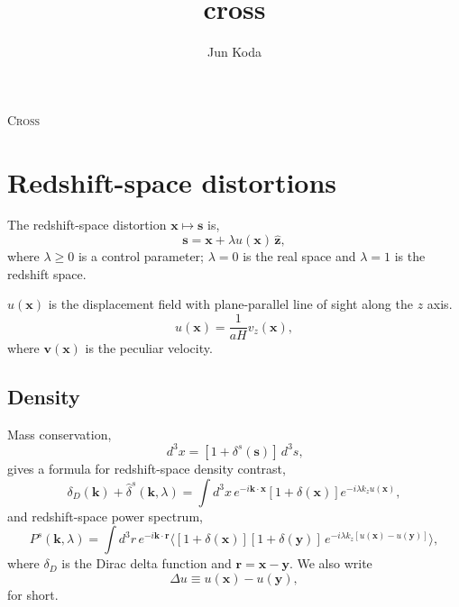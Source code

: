 \documentclass[a4paper,11pt, fleqn]{article}
\title{cross}
\author{Jun Koda}
\date{}
\begin{document}
%
%
\vspace{0.3 \paperheight}

\begin{center}
  {\Huge \textsc{Cross}}
\end{center}

\tableofcontents

\sectionfont{\sffamily\Huge\color{Green}\selectfont}
\subsectionfont{\sffamily\color{Green}\selectfont}
\subsubsectionfont{\sffamily\color{Green}\selectfont}
\paragraphfont{\sffamily\color{Green}\selectfont}

%
%
\newpage

\section{Redshift-space distortions}

The redshift-space distortion $\bm{x} \mapsto \bm{s}$ is,
%
\begin{equation}
  \bm{s} = \bm{x} + \lambda u(\bm{x}) \, \hat{\bm{z}},
\end{equation}
where $\lambda \ge 0$ is a control parameter; $\lambda = 0$ is the real space and $\lambda = 1$ is the redshift space.

$u(\bm{x})$ is the displacement field with plane-parallel line of
sight along the $z$ axis.
\begin{equation}
  u(\bm{x}) = \frac{1}{aH} v_z(\bm{x}),
\end{equation}
where $\bm{v}(\bm{x})$ is the peculiar velocity.

\subsection{Density}

Mass conservation,
%
\begin{equation}
  [1 + \delta(\bm{x})] \,d^3 x = [1 + \delta^s(\bm{s})] \,d^3 s,
\end{equation}
%
gives a formula for redshift-space density contrast,
%
\begin{equation}
  \label{eq:delta-s}
  \delta_D(\bm{k}) + \hat{\delta}^s(\bm{k}, \lambda)
  = \int \! d^3 x \, e^{-i\bm{k}\cdot\bm{x}} [1 + \delta(\bm{x})]
    e^{-i \lambda k_z u(\bm{x})},
\end{equation}
%
and redshift-space power spectrum,
%
\begin{equation}
  P^s(\bm{k}, \lambda) = \int \! d^3 r \, e^{-i\bm{k}\cdot\bm{r}}
  \Big\langle
      [1 + \delta(\bm{x})][1 + \delta(\bm{y})] \,
      e^{-i \lambda k_z [u(\bm{x}) - u(\bm{y})]}\Big\rangle,
\end{equation}
where $\delta_D$ is the Dirac delta function and $\bm{r} = \bm{x} - \bm{y}$.
We also write
\begin{equation}
  \Delta u \equiv u(\bm{x}) - u(\bm{y}),
\end{equation}
for short.
\end{document}

